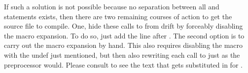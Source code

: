 \vspace{0.1 in}

If such a solution is not possible because no separation between all 
and  statements exists, then there are two remaining courses of action
to get the source file to compile.  One, hide these calls to 
from drift by forceably disabling the macro expansion.  To do so, just add the
line  after .  The
second option is to carry out the macro expansion by hand.  This also requires
disabling the macro with the undef just mentioned, but then also rewriting each
call to  just as the preprocessor would.  Please consult
 to see the text that gets substituted in for .
